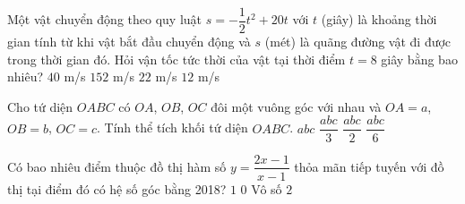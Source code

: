 \begin{ex}%
	Một vật chuyển động theo quy luật $s=-\dfrac{1}{2}t^2+20t$ với $t$ (giây) là khoảng thời gian tính từ khi vật bắt đầu chuyển động và $s$ (mét) là quãng đường vật đi được trong thời gian đó. Hỏi vận tốc tức thời của vật tại thời điểm $t=8$ giây bằng bao nhiêu?
	\choice
	{ $40 $ m/s}
	{ $152$ m/s}
	{$22$ m/s}
	{\True $12$ m/s}
	
	
\end{ex} 

\begin{ex}%
	Cho tứ diện $OABC$ có $OA$, $OB$, $OC$ đôi một vuông góc với nhau và $OA=a$, $OB=b$, $OC=c$. Tính thể tích khối tứ diện $OABC$.
	\choice
	{ $abc$}
	{ $\dfrac{abc}{3}$}
	{$\dfrac{abc}{2}$}
	{\True $\dfrac{abc}{6}$}
	
	
\end{ex} 


\begin{ex}%
	Có bao nhiêu điểm thuộc đồ thị hàm số $y=\dfrac{2x-1}{x-1}$ thỏa mãn tiếp tuyến với đồ thị tại điểm đó có hệ số góc bằng 2018?
	\choice
	{ $1$}
	{ \True $0$}
	{Vô số}
	{ $2$}
	
	
\end{ex} 


